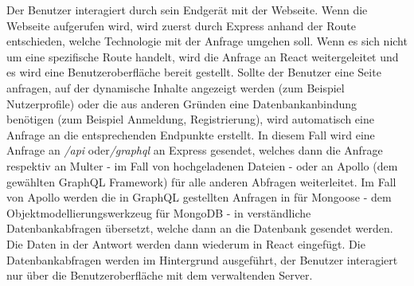 Der Benutzer interagiert durch sein Endgerät mit der Webseite. Wenn die Webseite aufgerufen wird, wird zuerst durch Express anhand der Route entschieden, welche Technologie mit der Anfrage umgehen soll. Wenn es sich nicht um eine spezifische Route handelt, wird die Anfrage an React weitergeleitet und es wird eine Benutzeroberfläche bereit gestellt. Sollte der Benutzer eine Seite anfragen, auf der dynamische Inhalte angezeigt werden (zum Beispiel Nutzerprofile) oder die aus anderen Gründen eine Datenbankanbindung benötigen (zum Beispiel Anmeldung, Registrierung), wird automatisch eine Anfrage an die entsprechenden Endpunkte erstellt. In diesem Fall wird eine Anfrage an \textit{/api} oder\textit{/graphql} an Express gesendet, welches dann die Anfrage respektiv an Multer - im Fall von hochgeladenen Dateien - oder an Apollo (dem gewählten GraphQL Framework) für alle anderen Abfragen weiterleitet. Im Fall von Apollo werden die in GraphQL gestellten Anfragen in für Mongoose - dem Objektmodellierungswerkzeug für MongoDB - in verständliche Datenbankabfragen übersetzt, welche dann an die Datenbank gesendet werden. Die Daten in der Antwort werden dann wiederum in React eingefügt. Die Datenbankabfragen werden im Hintergrund ausgeführt, der Benutzer interagiert nur über die Benutzeroberfläche mit dem verwaltenden Server.

